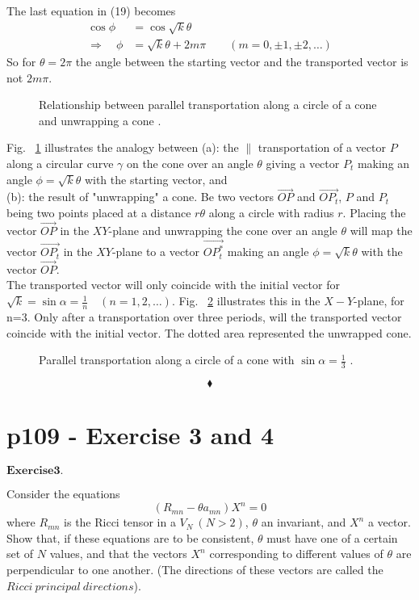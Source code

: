 The last equation in (19) becomes
\begin{align}
\cos{\phi} &= \cos{\sqrt{k}\theta} \\
\Rightarrow \quad \phi &= \sqrt{k}\theta + 2m\pi\quad\quad (m= 0,\pm 1,\pm 2, \dots)
\end{align}
So for $\theta = 2\pi$ the angle between the starting vector and the transported vector is not $2m\pi$. 
\begin{figure}[H]%
    \centering
    \subfloat[]{}
	\qquad
    \subfloat[]{}
\caption{Relationship between parallel transportation along a circle of a cone and unwrapping a cone .}
\label{fig:fig_p108_Ex2_b2}
\end{figure}
Fig. ~\ref{fig:fig_p108_Ex2_b2} illustrates the analogy between 
(a): the $\parallel$ transportation of a vector $P$ along a circular curve $\gamma$ on the cone over an angle $\theta$ giving a vector $P_t$ making an angle $\phi = \sqrt{k}\theta$ with the starting vector, and \\
(b): the result of "unwrapping" a cone. Be two vectors $\overrightarrow{OP}$ and $\overrightarrow{OP_t}$, $P$ and $P_t$ being two points placed at a distance $r\theta$ along a circle  with radius $r$. Placing the vector $\overrightarrow{OP}$ in the $XY$-plane and unwrapping the cone over an angle $\theta$ will map the vector $\overrightarrow{OP_t}$ in the $XY$-plane to a vector $\overrightarrow{OP_t^{*}}$ making an angle $\phi = \sqrt{k}\theta$ with the vector $\overrightarrow{OP}$.\\
The transported vector will only coincide with the initial vector for $\sqrt{k}=\sin{\alpha}  = \frac{1}{n}\quad (n= 1, 2, \dots)$. Fig. ~\ref{fig:fig_p108_Ex2_b3} illustrates this in the $X-Y$-plane,  for n=3. Only after a transportation over three periods, will the transported vector coincide with the initial vector. The dotted area represented the unwrapped cone.
\begin{figure}[H]%
    \centering
{}
\caption{Parallel transportation along a circle of a cone with $\sin{\alpha}  = \frac{1}{3}$ .}
\label{fig:fig_p108_Ex2_b3}
\end{figure}
$$\blacklozenge$$
\newpage

\section{p109 - Exercise 3 and 4}
$\mathbf{Exercise 3.}$\\
\begin{tcolorbox}
Consider the equations $$ \left( R_{mn} -\theta a_{mn}\right)X^n = 0$$ where $R_{mn}$ is the Ricci tensor in a $V_N \ (N>2)$, $\theta$ an invariant, and $X^n$ a vector. Show that, if these equations are to be consistent, $\theta$ must have one of a certain set of $N$ values, and that the vectors $X^n$ corresponding to different values of $\theta$ are perpendicular to one another. (The directions of these vectors are called the $\mathit{Ricci \ principal \ directions}$).
\end{tcolorbox}

